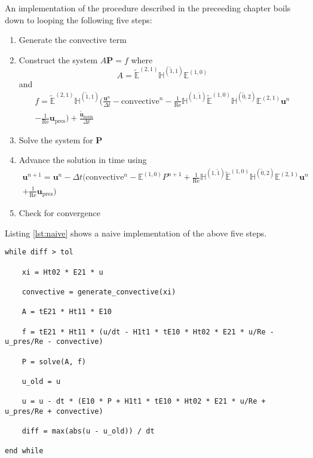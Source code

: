\documentclass[a4paper,10pt,parskip=half]{scrreprt}
\begin{document}
An implementation of the procedure described in the preceeding chapter boils down to looping the following five steps:
\begin{enumerate}
    \item Generate the convective term
    \item Construct the system $A \mathbf{P} = f$ where
\begin{equation}
    \label{eq:time9}
    A = \tilde{\mathbb{E}}^{(2,1)} \mathbb{H}^{(\tilde{1},1)} \mathbb{E}^{(1,0)}
\end{equation}
    and
\begin{multline}
    \label{eq:time10}
    f = \tilde{\mathbb{E}}^{(2,1)} \mathbb{H}^{(\tilde{1},1)} \biggl( \frac{\mathbf{u}^{n}}{\Delta t} - \text{convective}^{n} - \frac{1}{\text{Re}} \mathbb{H}^{(1,\tilde{1})} \tilde{\mathbb{E}}^{(1,0)} \mathbb{H}^{(\tilde{0},2)} \mathbb{E}^{(2,1)} \mathbf{u}^{n} \\
    - \frac{1}{\text{Re}} \mathbf{u}_{\text{pres}} \biggr) + \frac{\mathbf{\tilde{u}}^{}_{\text{norm}}}{\Delta t}
\end{multline}
    \item Solve the system for $\mathbf{P}$
    \item Advance the solution in time using
\begin{multline}
    \label{eq:time11}
    \mathbf{u}^{n+1} = \mathbf{u}^{n} - \Delta t \biggl( \text{convective}^{n} - \mathbb{E}^{(1,0)} P^{n+1} + \frac{1}{\text{Re}} \mathbb{H}^{(1,\tilde{1})} \tilde{\mathbb{E}}^{(1,0)} \mathbb{H}^{(\tilde{0},2)} \mathbb{E}^{(2,1)} \mathbf{u}^{n} \\
    + \frac{1}{\text{Re}} \mathbf{u}_{\text{pres}} \biggr)
\end{multline}
    \item Check for convergence
\end{enumerate}

Listing \ref{lst:naive} shows a naive implementation of the above five steps.

\begin{lstlisting}[caption=Naive implementation, label=lst:naive]
while diff > tol
    
    xi = Ht02 * E21 * u
    
    convective = generate_convective(xi)
    
    A = tE21 * Ht11 * E10
    
    f = tE21 * Ht11 * (u/dt - H1t1 * tE10 * Ht02 * E21 * u/Re - u_pres/Re - convective)
    
    P = solve(A, f)
    
    u_old = u
    
    u = u - dt * (E10 * P + H1t1 * tE10 * Ht02 * E21 * u/Re + u_pres/Re + convective)
    
    diff = max(abs(u - u_old)) / dt
    
end while
\end{lstlisting}
\end{document}
